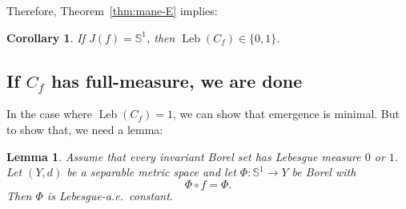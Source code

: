 \documentclass[12pt,a4paper,twoside]{article}
\theoremstyle{plain}
\newtheorem{lemma}[theorem]{Lemma}
\newtheorem{corollary}[theorem]{Corollary}
\theoremstyle{definition}
\newcommand{\Leb}{\operatorname{Leb}}
\newcommand{\Sone}{\mathbb{S}^1}
\begin{document}
	Therefore, Theorem~\ref{thm:mane-E} implies:
	
	\begin{corollary}\label{cor:C-01}
		If $J(f)=\Sone$, then $\Leb(C_{f})\in\{0,1\}$.
	\end{corollary}
    
\subsection{If \texorpdfstring{$C_{f}$}{Cf} has full-measure, we are done}
	
In the case where $\Leb(C_{f})=1$, we can show that emergence is minimal. But to show that, we need a lemma:
	
	\begin{lemma}\label{lem:ae-constancy}
		Assume that every invariant Borel set has Lebesgue measure $0$ or $1$.
		Let $(Y,d)$ be a separable metric space and let $\Phi\colon \Sone\to Y$ be Borel with
		\[
		\Phi\circ f=\Phi.
		\]
		Then $\Phi$ is Lebesgue-a.e.\ constant.
	\end{lemma}
	
\end{document}
